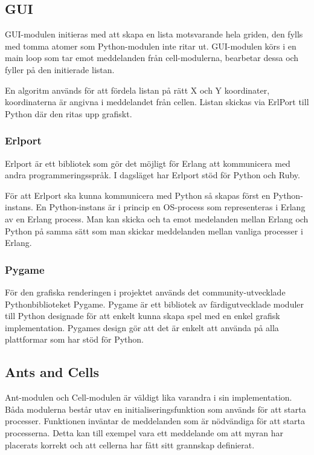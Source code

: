 \documentclass[12pt]{article}
\begin{document}
\subsection{GUI}
GUI-modulen initieras med att skapa en lista motsvarande hela griden,
den fylls med tomma atomer som Python-modulen inte ritar ut.
GUI-modulen körs i en main loop som tar emot meddelanden från cell-modulerna,
bearbetar dessa och fyller på den initierade listan.

En algoritm används för att fördela listan på rätt X och Y koordinater,
koordinaterna är angivna i meddelandet från cellen.
Listan skickas via ErlPort till Python där den ritas upp grafiskt.

\subsubsection{Erlport}
Erlport är ett bibliotek som gör det möjligt för Erlang att kommunicera med andra programmeringsspråk.
I dagsläget har Erlport stöd för Python och Ruby.

För att Erlport ska kunna kommunicera med Python så skapas först en Python-instans.
En Python-instans är i princip en OS-process som representeras i Erlang av en Erlang process.
Man kan skicka och ta emot medelanden mellan Erlang och Python på samma sätt som man skickar meddelanden mellan vanliga processer i Erlang.

\subsubsection{Pygame}
För den grafiska renderingen i projektet används det community-utvecklade Pythonbiblioteket Pygame.
Pygame är ett bibliotek av färdigutvecklade moduler till Python designade för att enkelt kunna skapa spel med en enkel grafisk implementation.
Pygames design gör att det är enkelt att använda på alla plattformar som har stöd för Python.

\subsection{Ants and Cells}
Ant-modulen och Cell-modulen är väldigt lika varandra i sin implementation.
Båda modulerna består utav en initialiseringsfunktion som används för att starta processer.
Funktionen inväntar de meddelanden som är nödvändiga för att starta processerna.
Detta kan till exempel vara ett meddelande om att myran har placerats korrekt och att cellerna har fått sitt grannskap definierat.
\end{document}
